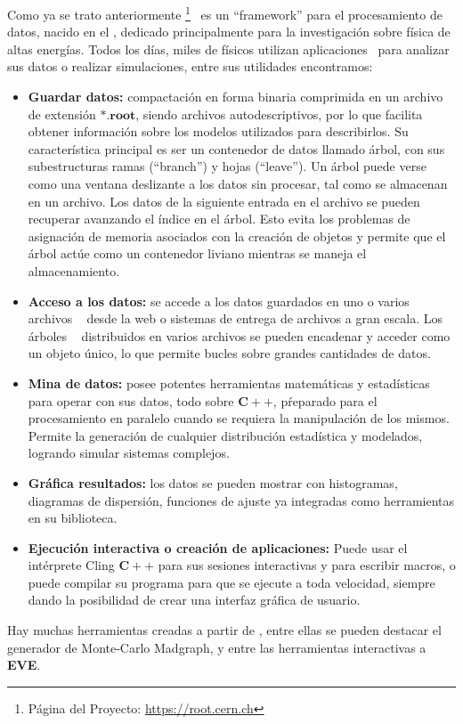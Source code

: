 Como ya se trato anteriormente \ROOT \footnote{Página del Proyecto: \href{https://root.cern.ch}{https://root.cern.ch}}~ es un ``framework'' para el procesamiento de datos, nacido en el \CERN, dedicado principalmente para la investigación sobre física de altas energías. Todos los días, miles de físicos utilizan aplicaciones \ROOT ~para analizar sus datos o realizar simulaciones, entre sus utilidades encontramos:
\begin{itemize}
\item \textbf{Guardar datos:} compactación en forma binaria comprimida en un archivo de extensión $\mathbf{*.root}$, siendo archivos autodescriptivos, por lo que facilita obtener información sobre los modelos utilizados para describirlos. Su característica principal es ser un contenedor de datos llamado árbol, con sus subestructuras ramas (``branch'') y hojas (``leave''). Un árbol puede verse como una ventana deslizante a los datos sin procesar, tal como se almacenan en un archivo. Los datos de la siguiente entrada en el archivo se pueden recuperar avanzando el índice en el árbol. Esto evita los problemas de asignación de memoria asociados con la creación de objetos y permite que el árbol actúe como un contenedor liviano mientras se maneja el almacenamiento.

\item \textbf{Acceso a los datos:} se accede a los datos guardados en uno o varios archivos \ROOT ~ desde la web o sistemas de entrega de archivos a gran escala. Los árboles \ROOT ~ distribuidos en varios archivos se pueden encadenar y acceder como un objeto único, lo que permite bucles sobre grandes cantidades de datos.

\item \textbf{Mina de datos:} posee potentes herramientas matemáticas y estadísticas para operar con sus datos, todo sobre $\mathbf{C++}$, pŕeparado para el procesamiento en paralelo cuando se requiera la manipulación de los mismos. Permite la generación de cualquier distribución estadística y modelados, logrando simular sistemas complejos.

\item \textbf{Gráfica resultados:} los datos se pueden mostrar con histogramas, diagramas de dispersión, funciones de ajuste ya integradas como herramientas en su biblioteca.

\item \textbf{Ejecución interactiva o creación de aplicaciones:} Puede usar el intérprete Cling $\mathbf{C++}$ para sus sesiones interactivas y para escribir macros, o puede compilar su programa para que se ejecute a toda velocidad, siempre dando la posibilidad de crear una interfaz gráfica de usuario.
\end{itemize}

Hay muchas herramientas creadas a partir de \ROOT, entre ellas se pueden destacar el generador de Monte-Carlo Madgraph, y entre las herramientas interactivas a \textbf{EVE}.


